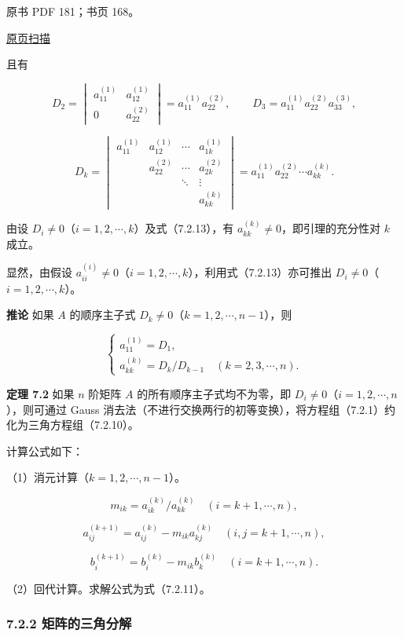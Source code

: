 \documentclass[
  10pt,
  fontset=fandol]{ctexart}
\begin{document}
\clearpage

原书 PDF 181；书页 168。

\href{/Users/xiangjunfeng/Desktop/数值计算专用/numerical-analysis/book/source-images/pdf-181.jpeg}{原页扫描}

且有

\[
D_2=\begin{vmatrix}a_{11}^{(1)}&a_{12}^{(1)}\\0&a_{22}^{(2)}\end{vmatrix}
=a_{11}^{(1)}a_{22}^{(2)},\qquad
D_3=a_{11}^{(1)}a_{22}^{(2)}a_{33}^{(3)},
\]

\[
D_k=\begin{vmatrix}
a_{11}^{(1)}&a_{12}^{(1)}&\cdots&a_{1k}^{(1)}\\
&a_{22}^{(2)}&\cdots&a_{2k}^{(2)}\\
&&\ddots&\vdots\\
&&&a_{kk}^{(k)}
\end{vmatrix}
=a_{11}^{(1)}a_{22}^{(2)}\cdots a_{kk}^{(k)}.
\tag{7.2.13}
\]

由设 \(D_i\ne0\)（\(i=1,2,\cdots,k\)）及式（7.2.13），有 \(a_{kk}^{(k)}\ne0\)，即引理的充分性对 \(k\) 成立。

显然，由假设 \(a_{ii}^{(i)}\ne0\)（\(i=1,2,\cdots,k\)），利用式（7.2.13）亦可推出 \(D_i\ne0\)（\(i=1,2,\cdots,k\)）。

\textbf{推论} 如果 \(A\) 的顺序主子式 \(D_k\ne0\)（\(k=1,2,\cdots,n-1\)），则

\[
\begin{cases}
a_{11}^{(1)}=D_1,\\
a_{kk}^{(k)}=D_k/D_{k-1}\quad(k=2,3,\cdots,n).
\end{cases}
\]

\textbf{定理 7.2} 如果 \(n\) 阶矩阵 \(A\) 的所有顺序主子式均不为零，即 \(D_i\ne0\)（\(i=1,2,\cdots,n\)），则可通过 Gauss 消去法（不进行交换两行的初等变换），将方程组（7.2.1）约化为三角方程组（7.2.10）。

计算公式如下：

（1）消元计算（\(k=1,2,\cdots,n-1\)）。

\[m_{ik}=a_{ik}^{(k)}/a_{kk}^{(k)}\quad(i=k+1,\cdots,n),\]

\[a_{ij}^{(k+1)}=a_{ij}^{(k)}-m_{ik}a_{kj}^{(k)}\quad(i,j=k+1,\cdots,n),\]

\[b_i^{(k+1)}=b_i^{(k)}-m_{ik}b_k^{(k)}\quad(i=k+1,\cdots,n).\]

（2）回代计算。求解公式为式（7.2.11）。

\subsubsection{7.2.2 矩阵的三角分解}\label{ux77e9ux9635ux7684ux4e09ux89d2ux5206ux89e3}
\end{document}
